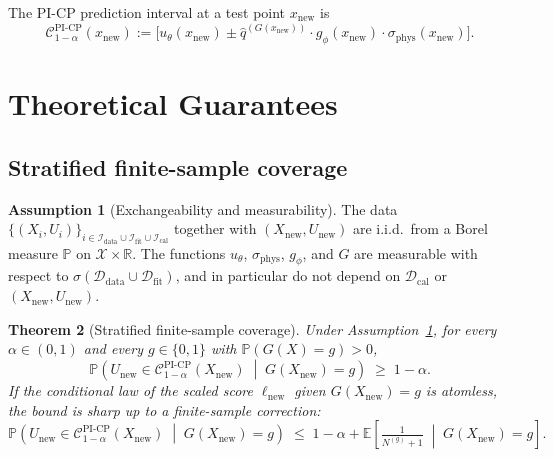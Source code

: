 \documentclass[11pt]{article}
\newtheorem{theorem}{Theorem}
\theoremstyle{definition}
\newtheorem{assumption}[theorem]{Assumption}
\theoremstyle{remark}
\newcommand{\R}{\mathbb{R}}
\newcommand{\PP}{\mathbb{P}}
\newcommand{\EE}{\mathbb{E}}
\newcommand{\Ddata}{\mathcal{D}_{\text{data}}}
\newcommand{\Dfit}{\mathcal{D}_{\text{fit}}}
\newcommand{\Dcal}{\mathcal{D}_{\text{cal}}}
\newcommand{\sphys}{\sigma_{\mathrm{phys}}}
\newcommand{\PICP}{\mathrm{PI\text{-}CP}}
\begin{document}
The PI-CP prediction interval at a test point $x_{\text{new}}$ is
\begin{equation}
    \mathcal{C}^{\PICP}_{1-\alpha}(x_{\text{new}}) := \Big[ u_\theta(x_{\text{new}}) \pm \hat{q}^{(G(x_{\text{new}}))} \cdot g_\phi(x_{\text{new}}) \cdot \sphys(x_{\text{new}}) \Big].
    \label{eq:interval}
\end{equation}

\section{Theoretical Guarantees}
\label{sec:theory}

\subsection{Stratified finite-sample coverage}

\begin{assumption}[Exchangeability and measurability]
\label{ass:main}
The data $\{(X_i, U_i)\}_{i \in \mathcal{I}_{\text{data}} \cup \mathcal{I}_{\text{fit}} \cup \mathcal{I}_{\text{cal}}}$ together with $(X_{\text{new}}, U_{\text{new}})$ are i.i.d.\ from a Borel measure $\PP$ on $\mathcal{X} \times \R$. The functions $u_\theta$, $\sphys$, $g_\phi$, and $G$ are measurable with respect to $\sigma(\Ddata \cup \Dfit)$, and in particular do not depend on $\Dcal$ or $(X_{\text{new}}, U_{\text{new}})$.
\end{assumption}

\begin{theorem}[Stratified finite-sample coverage]
\label{thm:strat}
Under Assumption~\ref{ass:main}, for every $\alpha \in (0,1)$ and every $g \in \{0, 1\}$ with $\PP(G(X) = g) > 0$,
\begin{equation}
    \PP\!\left( U_{\text{new}} \in \mathcal{C}^{\PICP}_{1-\alpha}(X_{\text{new}}) \;\middle|\; G(X_{\text{new}}) = g \right) \;\geq\; 1 - \alpha.
    \label{eq:strat-cov}
\end{equation}
If the conditional law of the scaled score $\ell_{\text{new}}$ given $G(X_{\text{new}}) = g$ is atomless, the bound is sharp up to a finite-sample correction:
\begin{equation}
    \PP\!\left( U_{\text{new}} \in \mathcal{C}^{\PICP}_{1-\alpha}(X_{\text{new}}) \;\middle|\; G(X_{\text{new}}) = g \right) \;\leq\; 1 - \alpha + \EE\!\left[\tfrac{1}{N^{(g)} + 1} \;\middle|\; G(X_{\text{new}}) = g\right].
\end{equation}
\end{theorem}
\end{document}
